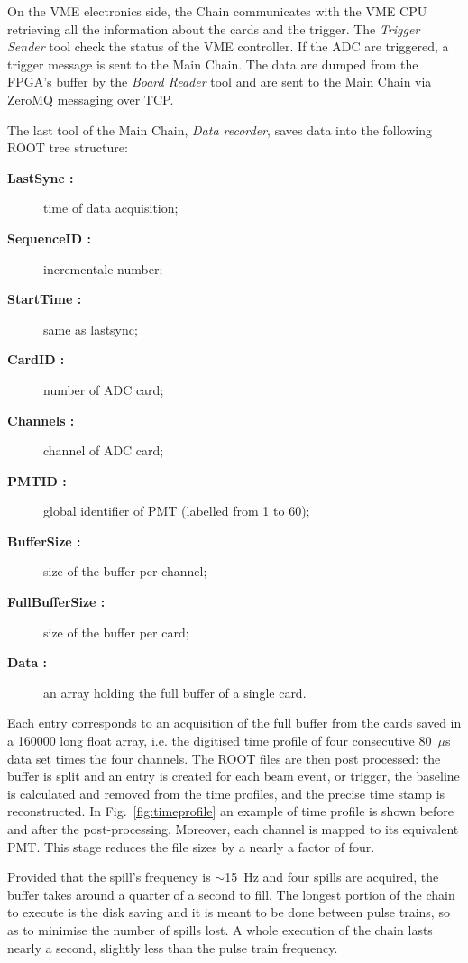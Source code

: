 On the VME electronics side, the Chain communicates with the VME CPU retrieving all the information %
about the cards and the trigger.
The \emph{Trigger Sender} tool check the status of the VME controller.
If the ADC are triggered, a trigger message is sent to the Main Chain.
The data are dumped from the FPGA's buffer by the \emph{Board Reader} tool and %
are sent to the Main Chain via ZeroMQ messaging over TCP.

The last tool of the Main Chain, \emph{Data recorder}, saves data into the following %
ROOT tree structure:
\begin{description}
  \item[\bfseries LastSync :] time of data acquisition;
  \item[\bfseries SequenceID :] incrementale number;
  \item[\bfseries StartTime :] same as lastsync;
  \item[\bfseries CardID :] number of ADC card;
  \item[\bfseries Channels :] channel of ADC card;
  \item[\bfseries PMTID :] global identifier of PMT (labelled from 1 to 60);
  \item[\bfseries BufferSize :] size of the buffer per channel;
  \item[\bfseries FullBufferSize :] size of the buffer per card;
  \item[\bfseries Data :] an array holding the full buffer of a single card.
\end{description}

 Each entry corresponds to an acquisition of the full buffer from the cards saved in a 160000 long %
 float array, i.e. the digitised time profile of four consecutive 80~$\mu$s data set times the four channels.
 The ROOT files are then post processed: the buffer is split and an entry is created for each %
 beam event, or trigger, the baseline is calculated and removed from the time profiles, and the precise %
 time stamp is reconstructed.
 In Fig.~\ref{fig:timeprofile} an example of time profile is shown before and after the post-processing.
 Moreover, each channel is mapped to its equivalent PMT.
 This stage reduces the file sizes by a nearly a factor of four.

 Provided that the spill's frequency is $\sim$15~Hz and four spills are acquired, the buffer %
 takes around a quarter of a second to fill.
 The longest portion of the chain to execute is the disk saving and it is meant to be done %
 between pulse trains, so as to minimise the number of spills lost.
 A whole execution of the chain lasts nearly a second, slightly less than the pulse train frequency.

